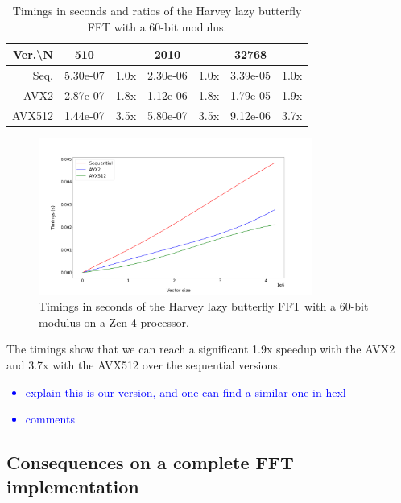 \documentclass[a4paper]{article}
\begin{document}
\begin{table}[h!]
\begin{tabular}{|r|*{3}{c c|}}
        \hline
        \rowcolor{myGray}
        Ver.\textbackslash N & 510 & & 2010 & & 32768 & \\
        \hline
        \cellcolor{myGray} Seq. & 5.30e-07 & 1.0x & 2.30e-06 & 1.0x & 3.39e-05 & 1.0x \\
        \hline
        \cellcolor{myGray} AVX2 & 2.87e-07 & 1.8x & 1.12e-06 & 1.8x & 1.79e-05 & 1.9x \\
        \hline
        \cellcolor{myGray} AVX512 & 1.44e-07 & 3.5x & 5.80e-07 & 3.5x & 9.12e-06 & 3.7x \\
        \hline
    \end{tabular}
    \caption{Timings in seconds and ratios of the Harvey lazy butterfly FFT with a 60-bit modulus.}
\end{table}

\begin{figure}[h!]
    \begin{center}
        \includegraphics[width=0.8\textwidth]{lazy-butterfly_argiope.png}
    \end{center}
    \caption{Timings in seconds of the Harvey lazy butterfly FFT with a 60-bit modulus on a Zen 4 processor.}
\end{figure}

The timings show that we can reach a significant 1.9x speedup with the AVX2 and 3.7x with the AVX512 over the
sequential versions.


\newpage
\textcolor{blue}{
    \begin{itemize}
        \item explain this is our version, and one can find a similar one in hexl
        \item  comments
    \end{itemize}
}

\subsection{Consequences on a complete FFT implementation}
\end{document}
